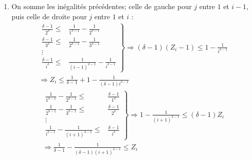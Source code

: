 \begin{enumerate}
\begin{enumerate}
\item On somme les inégalités précédentes; celle de gauche pour $j$ entre $1$ et $i-1$, puis celle de droite pour $j$ entre $1$ et $i$ :
\begin{multline*}
 \left.
\begin{aligned}
 \frac{\delta -1}{2^\delta}\leq& \frac{1}{1^{\delta -1}} - \frac{1}{2^{\delta -1}}\\
 \frac{\delta -1}{3^\delta}\leq& \frac{1}{2^{\delta -1}} - \frac{1}{3^{\delta -1}}\\
                              \vdots& \\
 \frac{\delta -1}{i^\delta}\leq& \frac{1}{(i-1)^{\delta -1}} - \frac{1}{i^{\delta -1}}
\end{aligned}
 \right\rbrace \Rightarrow
(\delta -1)(Z_i-1)\leq 1- \frac{1}{i^{\delta -1}}\\
\Rightarrow
Z_i \leq \frac{1}{\delta -1} +1 - \frac{1}{(\delta -1)i^{\delta -1}}
\end{multline*}
\begin{multline*}
 \left.
\begin{aligned}
  \frac{1}{1^{\delta -1}} - \frac{1}{2^{\delta -1}}\leq& \frac{\delta -1}{1^\delta}\\
 \frac{1}{2^{\delta -1}} - \frac{1}{3^{\delta -1}}\leq& \frac{\delta -1}{2^\delta}\\
                              \vdots& \\
  \frac{1}{i^{\delta -1}} - \frac{1}{(i+1)^{\delta -1}}\leq& \frac{\delta -1}{i^\delta}
\end{aligned}
 \right\rbrace \Rightarrow
 1- \frac{1}{(i+1)^{\delta -1}}\leq (\delta -1)Z_i\\
\Rightarrow
\frac{1}{\delta -1} - \frac{1}{(\delta -1)(i+1)^{\delta -1}}\leq Z_i
\end{multline*}


\end{enumerate}
\end{enumerate}
